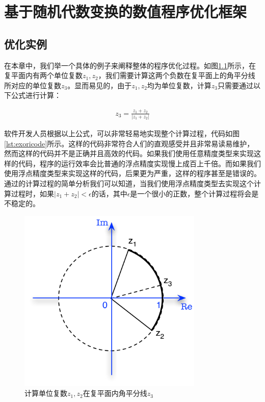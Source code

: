 \chapter{基于随机代数变换的数值程序优化框架}\label{chapter_framework}

\section{优化实例}
在本章中，我们举一个具体的例子来阐释整体的程序优化过程。如图\ref{fig:midarc}所示，在复平面内有两个单位复数$z_1,z_2$，我们需要计算这两个负数在复平面上的角平分线所对应的单位复数$z_3$。显而易见的，由于$z_1,z_2$均为单位复数，计算$z_3$只需要通过以下公式进行计算：

\begin{align}\label{eq:fpex}
    z_3=\frac{z_1+z_2}{\left|z_1+z_2\right|}
\end{align}

软件开发人员根据以上公式，可以非常轻易地实现整个计算过程，代码如图\ref{lst:exoricode}所示。这样的代码非常符合人们的直观感受并且非常易读易维护，然而这样的代码并不是正确并且高效的代码。如果我们使用任意精度类型来实现这样的代码，程序的运行效率会比普通的浮点精度实现慢上成百上千倍。而如果我们使用浮点精度类型来实现这样的代码，后果更为严重，这样的程序甚至是错误的。通过的计算过程的简单分析我们可以知道，当我们使用浮点精度类型去实现这个计算过程时，如果$|z_1+z_2| < \epsilon$的话，其中$\epsilon$是一个很小的正数，整个计算过程将会是不稳定的。

\begin{figure}[thbp]
   \centering
   \includegraphics[width=88mm]{fig/ExampleArc_formal.pdf}
   \caption{计算单位复数$z_1,z_2$在复平面内角平分线$z_3$} \label{fig:midarc}
\end{figure}

